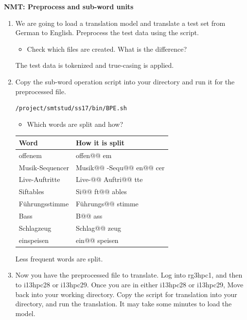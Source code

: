 \documentclass[12pt,fleqn]{article}
\begin{document}
\textbf{NMT: Preprocess and sub-word units} \\ 
\begin{enumerate}


\item We are going to load a translation model and translate a test set from German to English. Preprocess the test data using the script. 


\begin{itemize} 
 \item Check which files are created. What is the difference? 
\end{itemize}

The test data is tokenized and true-casing is applied. 

\item  Copy the sub-word operation script into your directory and run it for the preprocessed file. 

\texttt{/project/smtstud/ss17/bin/BPE.sh} 

\begin{itemize} 
 \item Which words are split and how?
\end{itemize}

\begin{table}[ht] 
 \begin{center} 
\begin{tabular}{p{5cm}|p{8cm}} 
 Word & How it is split \\  \hline 
 offenem & offen@@ em \\ 
 Musik-Sequencer & Musik@@ -Sequ@@ en@@ cer \\ 
 Live-Auftritte & Live-@@ Auftri@@ tte \\ 
 Siftables & Si@@ ft@@ ables \\ 
 Führungsstimme & Führungs@@ stimme \\ 
 Bass & B@@ ass \\ 
 Schlagzeug &  Schlag@@ zeug \\ 
 einspeisen & ein@@ speisen \\ 
\end{tabular}

 \end{center}

\end{table}

Less frequent words are split. 

\item Now you have the preprocessed file to translate. Log into rg3hpc1, and then to i13hpc28 or i13hpc29. Once you are in either i13hpc28 or i13hpc29, Move back into your working directory. Copy the script for translation into your directory, and run the translation. It may take some minutes to load the model. 


\end{enumerate}
\end{document}
